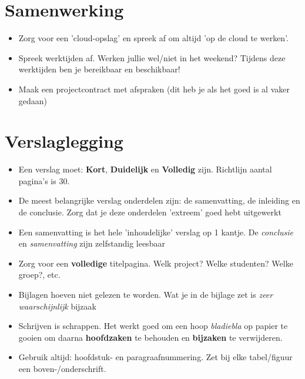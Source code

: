 \documentclass[24pt,a4paper]{article}
\begin{document}
\section{Samenwerking}
\begin{itemize}
      \mssep
      \item Zorg voor een 'cloud-opslag' en spreek af om altijd 'op de cloud te werken'.
      \item Spreek werktijden af. Werken jullie wel/niet in het weekend? Tijdens deze werktijden ben je bereikbaar en beschikbaar!
      \item Maak een projectcontract met afspraken (dit heb je als het goed is al vaker gedaan)
\end{itemize}


\section{Verslaglegging}
\begin{itemize}
      \mssep
      \item Een verslag moet: \textbf{Kort}, \textbf{Duidelijk} en \textbf{Volledig} zijn. Richtlijn aantal pagina's is $30$.
      \item De meest belangrijke verslag onderdelen zijn: de samenvatting, de inleiding en de conclusie. Zorg dat je deze onderdelen 'extreem' goed hebt uitgewerkt
      \item Een samenvatting is het hele 'inhoudelijke' verslag op 1 kantje.
            De \textit{conclusie} en \textit{samenvatting} zijn zelfstandig leesbaar
      \item Zorg voor een \textbf{volledige} titelpagina. Welk project? Welke studenten? Welke groep?, etc.
      \item Bijlagen hoeven niet gelezen te worden. Wat je in de bijlage zet is \textit{zeer waarschijnlijk} bijzaak
      \item Schrijven is schrappen. Het werkt goed om een hoop \textit{bladiebla} op papier te gooien om daarna \textbf{hoofdzaken} te behouden en \textbf{bijzaken} te verwijderen.
      \item Gebruik altijd: hoofdstuk- en paragraafnummering. Zet bij elke tabel/figuur een boven-/onderschrift.
\end{itemize}


\newpage
\end{document}
